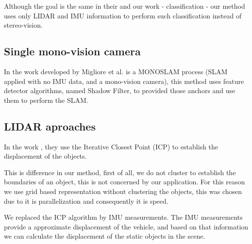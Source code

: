 Although the goal is the same in their and our work - classification - our method uses only LIDAR and IMU information to perform such classification instead of stereo-vision.

\subsection{Single mono-vision camera}

In the work developed by Migliore et al. \cite{Migliore_2009_ICRA} is a MONOSLAM process (SLAM applied with no IMU data, and a mono-vision camera), this method uses feature detector algorithms, named Shadow Filter, to provided those anchors and use them to perform the SLAM.

\subsection{LIDAR aproaches}

In the work \cite{4650636}, they use the Iterative Closest Point (ICP) \cite{10.1109/34.121791} to establish the displacement of the objects. 

This is difference in our method, first of all, we do not cluster to establish the boundaries of an object, this is not concerned by our application. For this reason we use grid based representation without clustering the objects, this was chosen due to it is parallelization and consequently it is speed.

We replaced the ICP algorithm by IMU measurements. The IMU measurements provide a approximate displacement of the vehicle, and based on that information we can calculate the displacement of the static objects in the scene.  
